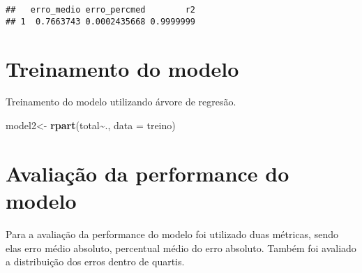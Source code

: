 \documentclass[
]{article}
\newenvironment{Shaded}{\begin{snugshade}}{\end{snugshade}}
\newcommand{\DataTypeTok}[1]{\textcolor[rgb]{0.13,0.29,0.53}{#1}}
\newcommand{\KeywordTok}[1]{\textcolor[rgb]{0.13,0.29,0.53}{\textbf{#1}}}
\newcommand{\NormalTok}[1]{#1}
\newcommand{\OperatorTok}[1]{\textcolor[rgb]{0.81,0.36,0.00}{\textbf{#1}}}
\newcommand{\StringTok}[1]{\textcolor[rgb]{0.31,0.60,0.02}{#1}}
\begin{document}
\begin{verbatim}
##   erro_medio erro_percmed        r2
## 1  0.7663743 0.0002435668 0.9999999
\end{verbatim}

\hypertarget{treinamento-do-modelo-1}{%
\section{Treinamento do modelo}\label{treinamento-do-modelo-1}}

Treinamento do modelo utilizando árvore de regresão.

\begin{Shaded}
\begin{Highlighting}[]
\NormalTok{model2\textless{}{-}}\StringTok{ }\KeywordTok{rpart}\NormalTok{(total}\OperatorTok{\textasciitilde{}}\NormalTok{., }\DataTypeTok{data =}\NormalTok{ treino)}
\end{Highlighting}
\end{Shaded}

\hypertarget{avaliauxe7uxe3o-da-performance-do-modelo-1}{%
\section{Avaliação da performance do
modelo}\label{avaliauxe7uxe3o-da-performance-do-modelo-1}}

Para a avaliação da performance do modelo foi utilizado duas métricas,
sendo elas erro médio absoluto, percentual médio do erro absoluto.
Também foi avaliado a distribuição dos erros dentro de quartis.
\end{document}

